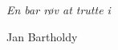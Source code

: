 \clearpage
\thispagestyle{empty}
\vspace*{3cm}
\hfill\textit{En bar røv at trutte i}
\par
\hfill\vspace*{4cm} Jan Bartholdy
\vspace*{\fill}
